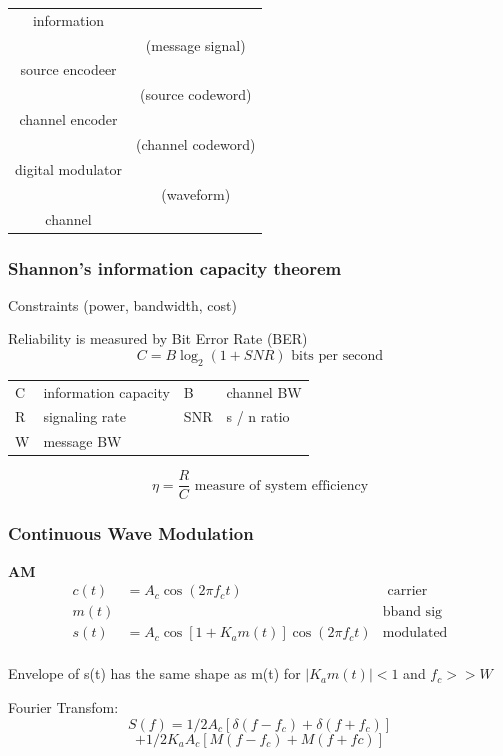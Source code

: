 \begin{tabular}{cc}
information&\\
&(message signal)\\
source encodeer&\\
&(source codeword)\\
channel encoder&\\
&(channel codeword)\\
digital modulator&\\
&(waveform)\\
channel&\\
\end{tabular}

\subsubsection*{Shannon's information capacity theorem}

Constraints (power, bandwidth, cost)

Reliability is measured by Bit Error Rate (BER)
\[
C = B \log_2 (1+SNR) \mbox{ \ \ bits per second}
\]
\begin{tabular}{llll}
C&information capacity&B& channel BW\\
R& signaling rate&SNR& s / n ratio\\
W& message BW\\
\end{tabular}
\[
\eta = \frac{R}{C} \mbox{ \ \ measure of system efficiency}
\]

\subsubsection*{Continuous Wave Modulation}
\textbf{AM}
\begin{align*}
c(t) &=A_c \cos (2\pi f_ct)& \mbox{ carrier}\\
m(t) &  &\mbox{bband sig}\\
s(t) &=A_c \cos \left[1+K_am(t)\right] \cos(2\pi f_ct) &\mbox{modulated}\\
\end{align*}

Envelope of s(t) has the same shape as m(t) for $|K_a m(t)| < 1$ and $f_c >> W$

Fourier Transfom:
\[S(f) = 1/2 A_c [\delta(f-f_c)+\delta(f+f_c)]\]
\[+ 1/2K_aA_c[M(f-f_c)+M(f+fc)]\]


